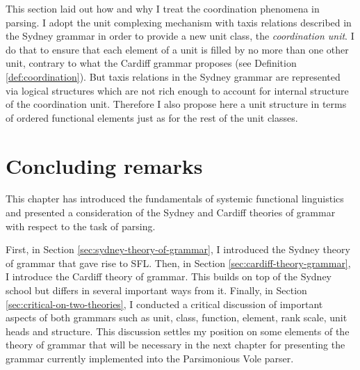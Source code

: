 

This section laid out how and why I treat the coordination phenomena in parsing. I adopt the unit complexing mechanism with taxis relations described in the Sydney grammar in order to provide a new unit class, the \textit{coordination unit}. I do that to ensure that each element of a unit is filled by no more than one other unit, contrary to what the Cardiff grammar proposes (see Definition \ref{def:coordination}). But taxis relations in the Sydney grammar are represented via logical structures which are not rich enough to account for internal structure of the coordination unit. Therefore I also propose here a unit structure in terms of ordered functional elements just as for the rest of the unit classes. 

\section{Concluding remarks}
This chapter has introduced the fundamentals of systemic functional linguistics and presented a consideration of the Sydney and Cardiff theories of grammar with respect to the task of parsing.

First, in Section \ref{sec:sydney-theory-of-grammar}, I introduced the Sydney theory of grammar that gave rise to SFL. Then, in Section \ref{sec:cardiff-theory-grammar}, I introduce the Cardiff theory of grammar. This builds on top of the Sydney school but differs in several important ways from it. Finally, in Section \ref{sec:critical-on-two-theories}, I conducted a critical discussion of important aspects of both grammars such as unit, class, function, element, rank scale, unit heads and structure. This discussion settles my position on some elements of the theory of grammar that will be necessary in the next chapter for presenting the grammar currently implemented into the Parsimonious Vole parser.

